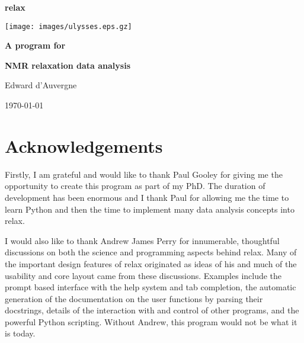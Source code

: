 \documentclass[a4paper, 11pt, twoside, openright]{book}
\begin{document}
\frontmatter



\begin{titlepage}
\begin{center}


{\Huge \textbf{relax}}

\centerline{\texttt{[image: images/ulysses.eps.gz]}}

{\huge \textbf{A program for}}

{\huge \textbf{NMR relaxation data analysis}}

{\Large Edward d'Auvergne}

{\large \today}

\end{center}
\end{titlepage}



\chapter*{Acknowledgements}

Firstly, I am grateful and would like to thank Paul Gooley for giving me the opportunity to create this program as part of my PhD.  The duration of development has been enormous and I thank Paul for allowing me the time to learn Python and then the time to implement many data analysis concepts into relax.

I would also like to thank Andrew James Perry for innumerable, thoughtful discussions on both the science and programming aspects behind relax.  Many of the important design features of relax originated as ideas of his and much of the usability and core layout came from these discussions.  Examples include the prompt based interface with the help system and tab completion, the automatic generation of the documentation on the user functions by parsing their docstrings, details of the interaction with and control of other programs, and the powerful Python scripting.  Without Andrew, this program would not be what it is today.
\end{document}
